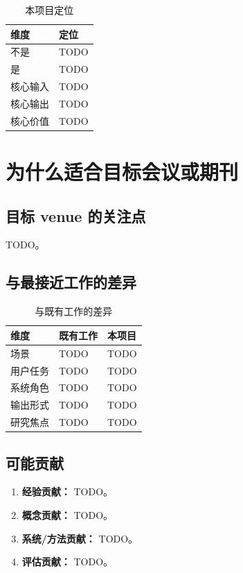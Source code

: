 \documentclass[UTF8,a4paper,11pt]{ctexart}
\begin{document}
\begin{table}[H]
\centering
\caption{本项目定位}
\begin{tabularx}{\textwidth}{p{3cm}X}
\toprule
\textbf{维度} & \textbf{定位} \\
\midrule
不是 & TODO \\
\midrule
是 & TODO \\
\midrule
核心输入 & TODO \\
\midrule
核心输出 & TODO \\
\midrule
核心价值 & TODO \\
\bottomrule
\end{tabularx}
\end{table}

\section{为什么适合目标会议或期刊}

\subsection{目标 venue 的关注点}

TODO。

\subsection{与最接近工作的差异}

\begin{table}[H]
\centering
\caption{与既有工作的差异}
\begin{tabularx}{\textwidth}{p{3.2cm}p{4cm}X}
\toprule
\textbf{维度} & \textbf{既有工作} & \textbf{本项目} \\
\midrule
场景 & TODO & TODO \\
\midrule
用户任务 & TODO & TODO \\
\midrule
系统角色 & TODO & TODO \\
\midrule
输出形式 & TODO & TODO \\
\midrule
研究焦点 & TODO & TODO \\
\bottomrule
\end{tabularx}
\end{table}

\subsection{可能贡献}

\begin{enumerate}[leftmargin=2em]
  \item \textbf{经验贡献：} TODO。
  \item \textbf{概念贡献：} TODO。
  \item \textbf{系统/方法贡献：} TODO。
  \item \textbf{评估贡献：} TODO。
\end{enumerate}
\end{document}
